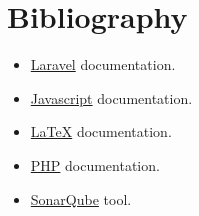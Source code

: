 \chapter{Bibliography}
\begin{itemize}
	\item \href{https://laraveles.com/documentacion/}{Laravel} documentation.
	\item \href{https://developer.mozilla.org/es/docs/Web/JavaScript}{Javascript} documentation.
	\item \href{https://es.wikibooks.org/wiki/Manual_de_LaTeX/Texto_completo}{\LaTeX} documentation.
	\item \href{https://www.php.net/manual/es/index.php}{PHP} documentation.
	\item \href{https://www.sonarqube.org/}{SonarQube} tool.
\end{itemize}